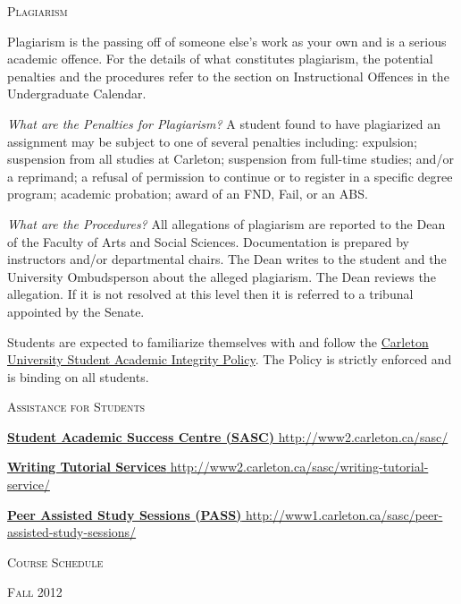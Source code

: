 \documentclass[12pt]{article}
\begin{document}
\vspace{.125in}

{\large \textsc{Plagiarism}}

Plagiarism is the passing off of someone else's work as your own and is a serious academic offence. For the details of what constitutes plagiarism, the potential penalties and the procedures refer to the section on Instructional Offences in the Undergraduate Calendar.

\textit{What are the Penalties for Plagiarism?} A student found to have plagiarized an assignment may be subject to one of several penalties including: expulsion; suspension from all studies at Carleton; suspension from full-time studies; and/or a reprimand; a refusal of permission to continue or to register in a specific degree program; academic probation; award of an FND, Fail, or an ABS.

\textit{What are the Procedures?} All allegations of plagiarism are reported to the Dean of the Faculty of Arts and Social Sciences. Documentation is prepared by instructors and/or departmental chairs. The Dean writes to the student and the University Ombudsperson about the alleged plagiarism. The Dean reviews the allegation. If it is not resolved at this level then it is referred to a tribunal appointed by the Senate. 

Students are expected to familiarize themselves with and follow the \href{http://www2.carleton.ca/studentaffairs/academic-integrity}{Carleton University Student Academic Integrity Policy}. The Policy is strictly enforced and is binding on all students.

{\large \textsc{Assistance for Students}}

\href{http://www2.carleton.ca/sasc/}{\textbf{Student Academic Success Centre (SASC)} http://www2.carleton.ca/sasc/}

\href{http://www2.carleton.ca/sasc/writing-tutorial-service/}{\textbf{Writing Tutorial Services} http://www2.carleton.ca/sasc/writing-tutorial-service/} 

\href{http://www1.carleton.ca/sasc/peer-assisted-study-sessions/}{\textbf{Peer Assisted Study Sessions (PASS)} http://www1.carleton.ca/sasc/peer-assisted-study-sessions/}

\newpage

\begin{center}
{\Large \textsc{Course Schedule}}

\vspace{.125in}

{\Large \textsc{Fall 2012}}
\end{center}
\end{document}
